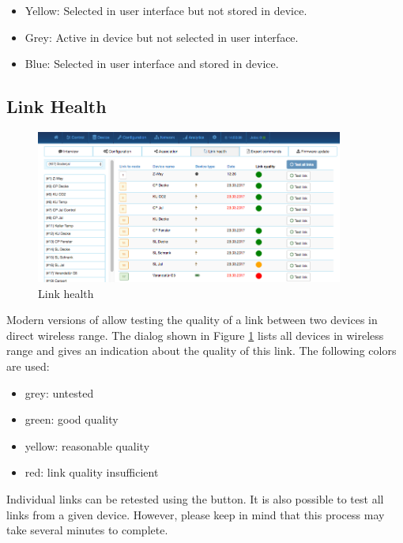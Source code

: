 \begin{itemize}
\item Yellow: Selected in user interface but not stored in device.
\item Grey: Active in device but not selected in user interface.
\item Blue: Selected in user interface and stored in device.
\end{itemize}

\subsection{Link Health}

\begin{figure}
\begin{center}
\includegraphics[width=0.9\textwidth]{pngs/cap7/eui36.png}
\caption{Link health}
\label{eui36}
\end{center}
\end{figure}

Modern versions of \zwave allow testing the quality of a link between two devices in 
direct wireless range. The dialog shown in Figure \ref{eui36} lists all devices in 
wireless range and gives an indication about the quality of this link. The following 
colors are used:

\begin{itemize}
\item grey: untested
\item green: good quality
\item yellow: reasonable quality
\item red: link quality insufficient
\end{itemize}

Individual links can be retested using the  button. It is also possible to 
test all links from a given device. However, please keep in mind that this process may 
take several minutes to complete.


